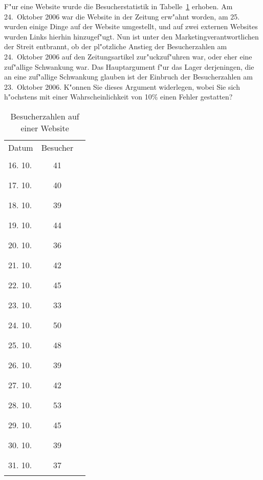 F"ur eine Website wurde die Besucherstatistik
in Tabelle~\ref{80000011:besucher}
erhoben. Am 24.~Oktober 2006 war die Website in der Zeitung erw"ahnt worden,
am 25. wurden einige Dinge auf der Website umgestellt, und auf zwei externen
Websites wurden Links hierhin hinzugef"ugt.
Nun ist unter den Marketingverantwortlichen der Streit entbrannt,
ob der pl"otzliche Anstieg der Besucherzahlen am 24.~Oktober 2006
auf den Zeitungsartikel zur"uckzuf"uhren war, oder eher eine zuf"allige
Schwankung war.
Das Hauptargument f"ur das Lager derjeningen, die an eine zuf"allige Schwankung
glauben ist der Einbruch der Besucherzahlen am 23.~Oktober 2006.
K"onnen Sie dieses Argument widerlegen, wobei Sie sich
h"ochstens mit einer Wahrscheinlichkeit von 10\% einen Fehler gestatten?

\begin{table}
\begin{center}
\begin{tabular}{lcl}
Datum&Besucher&\\
16. 10.&41&\rule{41mm}{5pt}\\
17. 10.&40&\rule{40mm}{5pt}\\
18. 10.&39&\rule{39mm}{5pt}\\
19. 10.&44&\rule{44mm}{5pt}\\
20. 10.&36&\rule{36mm}{5pt}\\
21. 10.&42&\rule{42mm}{5pt}\\
22. 10.&45&\rule{45mm}{5pt}\\
23. 10.&33&\rule{33mm}{5pt}\\
24. 10.&50&\rule{50mm}{5pt}\\
25. 10.&48&\rule{48mm}{5pt}\\
26. 10.&39&\rule{39mm}{5pt}\\
27. 10.&42&\rule{42mm}{5pt}\\
28. 10.&53&\rule{53mm}{5pt}\\
29. 10.&45&\rule{45mm}{5pt}\\
30. 10.&39&\rule{39mm}{5pt}\\
31. 10.&37&\rule{37mm}{5pt}\\
\end{tabular}
\end{center}
\caption{Besucherzahlen auf einer Website\label{80000011:besucher}}
\end{table}

